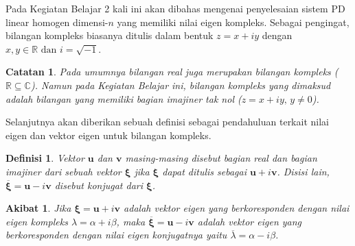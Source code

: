 \documentclass[a4paper]{article}
\theoremstyle{definisi}
\newtheorem{definisi}{Definisi}[section]
\newtheorem{catatan}{Catatan}[section]
\newtheorem{akibat}{Akibat}[section]
\newcommand{\bfxi}{\boldsymbol{\xi}}
\numberwithin{equation}{section}
\newcommand{\R}{\mathbb{R}}
\newcommand{\C}{\mathbb{C}}
\begin{document}
  Pada Kegiatan Belajar 2 kali ini akan dibahas mengenai penyelesaian sistem PD linear homogen dimensi-$n$ yang memiliki nilai eigen kompleks. Sebagai pengingat, bilangan kompleks biasanya ditulis dalam bentuk $z=x+iy$ dengan $x,y\in\R\text{ dan }i=\sqrt{-1}$. 

  \begin{catatan}
    Pada umumnya bilangan real juga merupakan bilangan kompleks ($\R\subseteq\C$). Namun pada Kegiatan Belajar ini, bilangan kompleks yang dimaksud adalah bilangan yang memiliki bagian imajiner tak nol ($z=x+iy,\,y\ne 0$).
  \end{catatan}

  Selanjutnya akan diberikan sebuah definisi sebagai pendahuluan terkait nilai eigen dan vektor eigen untuk bilangan kompleks.

  \begin{definisi}\label{definisi_vektor_kompleks}
    Vektor $\mathbf{u}$ dan $\mathbf{v}$ masing-masing disebut bagian real dan bagian imajiner dari sebuah vektor $\bfxi$ jika $\bfxi$ dapat ditulis sebagai $\mathbf{u} + i\mathbf{v}$. Disisi lain, $\overline{\bfxi} = \mathbf{u} - i\mathbf{v}$ disebut konjugat dari $\bfxi$.
  \end{definisi}
  \begin{akibat}\label{akibat_vektor_kompleks}
    Jika $\bfxi=\mathbf{u}+i\mathbf{v}$ adalah vektor eigen yang berkoresponden dengan nilai eigen kompleks $\lambda=\alpha+i\beta$, maka $\overline{\bfxi}=\mathbf{u}-i\mathbf{v}$ adalah vektor eigen yang berkoresponden dengan nilai eigen konjugatnya yaitu $\overline{\lambda}=\alpha-i\beta$.
  \end{akibat}
\end{document}
